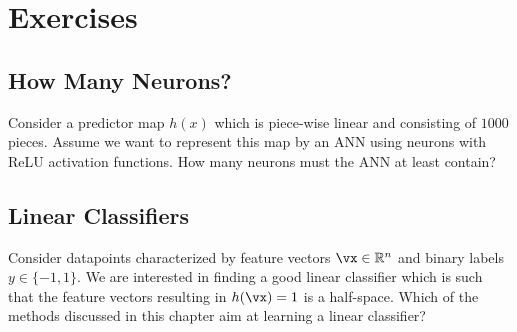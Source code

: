 \documentclass[12pt]{report}
\begin{document}
%
%
%

\section{Exercises}

\subsection{How Many Neurons?} 
\label{exercise_how_many_neurons} 
Consider a predictor map $h(x)$ which is piece-wise linear and consisting 
of $1000$ pieces. Assume we want to represent this map by an ANN using 
neurons with ReLU activation functions. How many neurons must the ANN 
at least contain?

\subsection{Linear Classifiers} 
\label{exercise_linear_classifier} 
Consider datapoints characterized by feature vectors $\vx \in \mathbb{R}^{n}$ and 
binary labels $y \in\{-1,1\}$. We are interested in finding a good linear classifier which is such that 
the feature vectors resulting in $h(\vx) = 1$ is a half-space. Which of the methods 
discussed in this chapter aim at learning a linear classifier?
\end{document}
